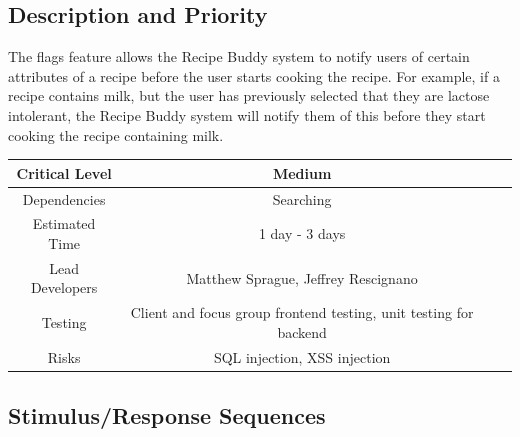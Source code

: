 \documentclass{scrreprt}
\begin{document}
\subsection{Description and Priority}

The flags feature allows the \gls{Recipe Buddy} system to notify users of certain attributes of a recipe before the user starts cooking the recipe. For example, if a recipe contains milk, but the user has previously selected that they are lactose intolerant, the \gls{Recipe Buddy} system will notify them of this before they start cooking the recipe containing milk.

\begin{center}
    \begin{tabular}{| c | c | c | c |}
        \hline
        Critical Level  & Medium                                                            \\
        \hline
        Dependencies    & Searching                                                         \\
        \hline
        Estimated Time  & 1 day - 3 days                                                    \\
        \hline
        Lead Developers & Matthew Sprague, Jeffrey Rescignano              \\
        \hline
        Testing         & Client and focus group \gls{frontend} testing,
                          \gls{unit testing} for \gls{backend}                              \\
        \hline
        Risks           & \gls{SQL injection}, \gls{XSS injection}                          \\
        \hline
    \end{tabular}
\end{center}

\subsection{Stimulus/Response Sequences}
\end{document}
